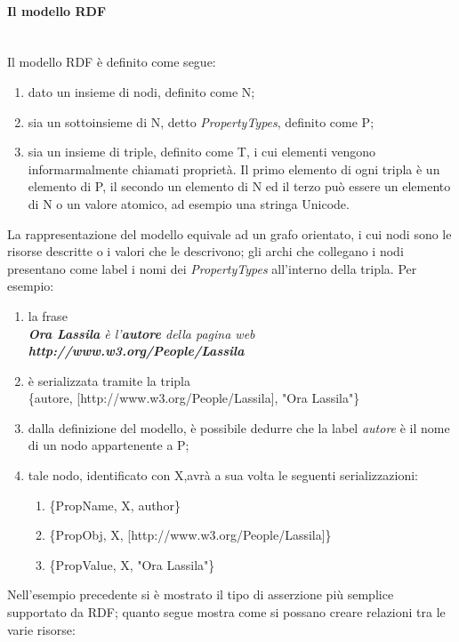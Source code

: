 \documentclass[12pt,a4paper,twoside]{book}
\begin{document}
\paragraph{Il modello RDF}\mbox{}\\
Il modello RDF è definito come segue\cite{RDF}:
\begin{enumerate}
\item dato un insieme di nodi, definito come N;
\item sia un sottoinsieme di N, detto \textit{PropertyTypes}, definito come P;
\item sia un insieme di triple, definito come T, i cui elementi vengono informarmalmente chiamati proprietà. Il primo elemento di ogni tripla è un elemento di P, il secondo un elemento di N ed il terzo può essere un elemento di N o un valore atomico, ad esempio una stringa Unicode.
\end{enumerate}
La rappresentazione del modello equivale ad un grafo orientato, i cui nodi sono le risorse descritte o i valori che le descrivono; gli archi che collegano i nodi presentano come label i nomi dei \textit{PropertyTypes} all'interno della tripla. Per esempio:
\begin{enumerate}
\item la frase \\\textit{\textbf{Ora Lassila} è l'\textbf{autore} della pagina web \textbf{http://www.w3.org/People/Lassila}}
\item è serializzata tramite la tripla \\ \{autore, [http://www.w3.org/People/Lassila], "Ora Lassila"\}
\item dalla definizione del modello, è possibile dedurre che la label \textit{autore} è il nome di un nodo appartenente a P;
\item tale nodo, identificato con X,avrà a sua volta le seguenti serializzazioni:
\begin{enumerate}
\item \{PropName,  X, author\}
\item \{PropObj,   X, [http://www.w3.org/People/Lassila]\}
\item \{PropValue, X, "Ora Lassila"\}
\end{enumerate}

\end{enumerate}
Nell'esempio precedente si è mostrato il tipo di asserzione più semplice supportato da RDF; quanto segue mostra come si possano creare relazioni tra le varie risorse:
\end{document}

